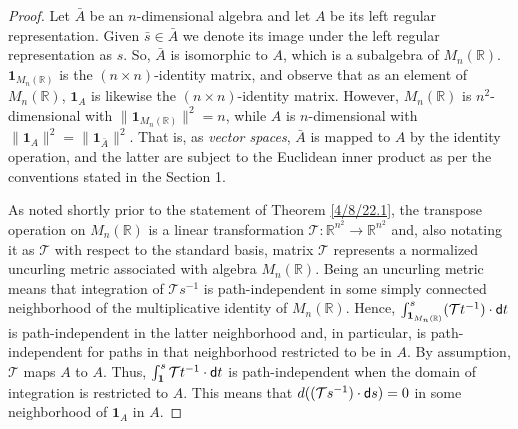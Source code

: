 \documentclass{amsart}
\numberwithin{equation}{section}
\theoremstyle{definition}
\numberwithin{theorem}{section}
\begin{document}
\begin{proof} 
Let $\bar{A}$ be an $n$-dimensional algebra and let $A$ be its left regular representation.  Given $\bar{s}\in\bar{A}$ we denote its image under the left regular representation as $s$.
 So, $\bar{A}$ is isomorphic to $A$, which is a subalgebra of $ M_n(\mathbb{R})$.   $\mathbf{1}_{M_n(\mathbb{R})}$ is the $(n\times n)$-identity matrix, and observe that as an element of $ M_n(\mathbb{R})$, $\mathbf{1}_A$ is likewise the $(n\times n)$-identity matrix.  However, $ M_n(\mathbb{R})$ is $n^2$-dimensional with $\|\mathbf{1}_{M_n(\mathbb{R})}\|^2 = n$, while $A$ is $n$-dimensional with $\|\mathbf{1}_A\|^2 = \|\mathbf{1}_{\bar{A}}\|^2$.  That is, as {\it vector spaces}, $\bar{A}$ is mapped to  $A$ by the identity operation, and the latter are subject to the Euclidean inner product as per the conventions stated in the Section 1.   

As noted shortly prior to the statement of Theorem \ref{4/8/22.1}, the transpose operation on $ M_n(\mathbb{R})$ is a linear transformation $\mathcal{\mathcal{T}}:\mathbb{R}^{n^2}\rightarrow \mathbb{R}^{n^2}$ and, also notating it as $\mathcal{\mathcal{T}}$ with respect to the standard basis, matrix $\mathcal{\mathcal{T}}$ represents a normalized uncurling metric associated with algebra  $ M_n(\mathbb{R})$.  Being an uncurling metric means that integration of $\mathcal{\mathcal{T}}s^{-1}$ is path-independent in some simply connected neighborhood of the multiplicative identity of $ M_n(\mathbb{R})$.  
 Hence, $\int_{\mathbf{1}_{M_n({\mathbb{R})}}}^s (\mathcal{\mathcal{T}}t^{-1})\cdot {\sf d}t$ is path-independent in the latter neighborhood and, in particular, is path-independent for paths in that neighborhood restricted to be in $A$.  By assumption, $\mathcal{\mathcal{T}}$ maps $A$ to $A$. 
 Thus, $\int_\mathbf{1}^s \mathcal{\mathcal{T}}t^{-1}\cdot {\sf d}t$ is path-independent when the domain of integration is restricted to $A$.  This means that 
  $d((\mathcal{\mathcal{T}}s^{-1})\cdot {\sf d}s) = 0$ in some neighborhood of $\mathbf{1}_A$ in $A$.
  

\end{proof}
\end{document}
